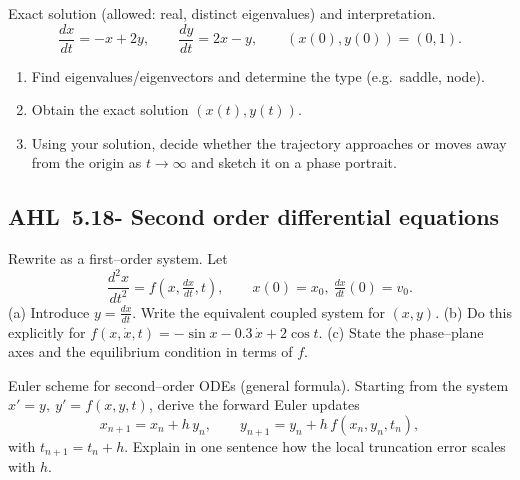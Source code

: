 \documentclass[11pt]{article}
\def\textbf#1{#1}%
\newcommand{\tocsubsection}[1]{\subsection{#1}}
\newcounter{question}
\begin{document}
\begin{question}
\textbf{Exact solution (allowed: real, distinct eigenvalues) and interpretation.}
\[
\frac{dx}{dt}=-x+2y,\qquad \frac{dy}{dt}=2x-y,\qquad (x(0),y(0))=(0,1).
\]
\begin{enumerate}
  \item Find eigenvalues/eigenvectors and determine the type (e.g.\ saddle, node).
  \item Obtain the exact solution $(x(t),y(t))$.
  \item Using your solution, decide whether the trajectory approaches or moves away from the origin as $t\to\infty$ and sketch it on a phase portrait.
\end{enumerate}
\end{question}




\tocsubsection{AHL 5.18- Second order differential equations}


\begin{question}
\textbf{Rewrite as a first–order system.}
Let
\[
\frac{d^{2}x}{dt^{2}}=f(x,\tfrac{dx}{dt},t),\qquad x(0)=x_{0},\ \tfrac{dx}{dt}(0)=v_{0}.
\]
(a) Introduce \(y=\tfrac{dx}{dt}\). Write the equivalent coupled system for \((x,y)\).  
(b) Do this explicitly for \(f(x,\dot x,t)=-\sin x-0.3\,\dot x+2\cos t\).  
(c) State the phase–plane axes and the equilibrium condition in terms of \(f\).
\end{question}

\begin{question}
\textbf{Euler scheme for second–order ODEs (general formula).}
Starting from the system \(x'=y,\ y'=f(x,y,t)\), derive the forward Euler updates
\[
x_{n+1}=x_n+h\,y_n,\qquad y_{n+1}=y_n+h\,f(x_n,y_n,t_n),
\]
with \(t_{n+1}=t_n+h\). Explain in one sentence how the local truncation error scales with \(h\).
\end{question}
\end{document}
